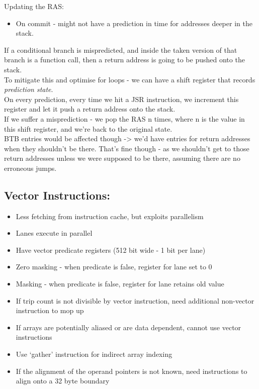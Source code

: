 \documentclass[a4paper, 5pt, twocolumn]{article}
\begin{document}
Updating the RAS:
\begin{itemize}[topsep=0pt,itemsep=-1ex,partopsep=1ex,parsep=1ex]
	\item On commit - might not have a prediction in time for addresses deeper in the stack. \\
\end{itemize}

If a conditional branch is mispredicted, and inside the taken version of
that branch is a function call, then a return address is going to be
pushed onto the stack. \\

To mitigate this and optimise for loops - we can have a shift register
that records \emph{prediction state}. \\

On every prediction, every time we hit a JSR instruction, we increment
this register and let it push a return address onto the stack. \\

If we suffer a misprediction - we pop the RAS n times, where n is the
value in this shift register, and we're back to the original state. \\

BTB entries would be affected though -\textgreater{} we'd have entries
for return addresses when they shouldn't be there. That's fine though -
as we shouldn't get to those return addresses unless we were supposed to
be there, assuming there are no erroneous jumps. \\

\hypertarget{vector-instructions}{%
\subsection{Vector Instructions:}\label{vector-instructions}}

\begin{itemize} [topsep=0pt,itemsep=-1ex,partopsep=1ex,parsep=1ex]
\item
  Less fetching from instruction cache, but exploits parallelism
\item
  Lanes execute in parallel
\item
  Have vector predicate registers (512 bit wide - 1 bit per lane)
\item
  Zero masking - when predicate is false, register for lane set to 0
\item
  Masking - when predicate is false, register for lane retains old value
\item
  If trip count is not divisible by vector instruction, need additional
  non-vector instruction to mop up
\item
  If arrays are potentially aliased or are data dependent, cannot use
  vector instructions
\item
  Use `gather' instruction for indirect array indexing
\item
  If the alignment of the operand pointers is not known, need
  instructions to align onto a 32 byte boundary
\end{itemize}
\end{document}
